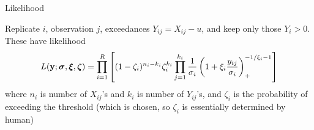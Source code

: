 \documentclass[mathserif, 11pt, t]{beamer}
\begin{document}
% 
% 
% 


\begin{frame}{Likelihood}

Replicate $i$, observation $j$, exceedances $Y_{ij} = X_{ij} - u$, and keep only those $Y_i > 0$. These have likelihood
\[ L(\mathbf{\bm{y}}; \mathbf{\bm{\sigma}}, \mathbf{\bm{\xi}}, \mathbf{\bm{\zeta}}) = \prod_{i=1}^R\left[(1-\zeta_i)^{n_i-k_i}\zeta_i^{k_i}\prod_{j=1}^{k_i}\frac{1}{\sigma_i}\left(1+\xi_i\frac{y_{ij}}{\sigma_i}\right)_+^{-1/\xi_i-1}\right] \]
where $n_i$ is number of $X_{ij}$'s and $k_i$ is number of $Y_{ij}$'s, and $\zeta_i$ is the probability of exceeding the threshold (which is chosen, so $\zeta_i$ is essentially determined by human)

\end{frame}
\end{document}
